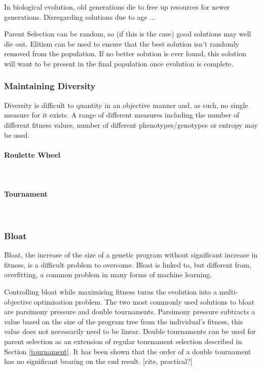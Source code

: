 \documentclass{article}
\newcommand{\myparagraph}[1]{\paragraph{#1}\mbox{}\\}
\begin{document}
In biological evolution, old generations die to free up resources for newer generations.
Disregarding solutions due to age ... %

Parent Selection can be random, so (if this is the case) good solutions may well die out. Elitism can be used to ensure that the best solution isn't randomly removed from the population. If no better solution is ever found, this solution will want to be present in the final population once evolution is complete.


\subsubsection{Maintaining Diversity}
Diversity is difficult to quantity in an objective manner and, as such, no single measure for it exists. A range of different measures including the number of different fitness values, number of different phenotypes/genotypes or entropy may be used\cite{textbook}.

\myparagraph{Roulette Wheel}

\myparagraph{Tournament}
\label{tournament}

\subsubsection{Bloat}%
Bloat, the increase of the size of a genetic program without significant increase in fitness, is a difficult problem to overcome. Bloat is linked to, but different from, overfitting, a common problem in many forms of machine learning\cite{overfitting_bloat}. %

Controlling bloat while maximising fitness turns the evolution into a multi-objective optimisation problem. The two most commonly used solutions to bloat are parsimony pressure and double tournaments. Parsimony pressure subtracts a value based on the size of the program tree from the individual's fitness, this value does not necessarily need to be linear. %
Double tournaments can be used for parent selection as an extension of regular tournament selection described in Section \ref{tournament}.
It has been shown that the order of a double tournament has no significant bearing on the end result. [cite, practical?]%
\end{document}
